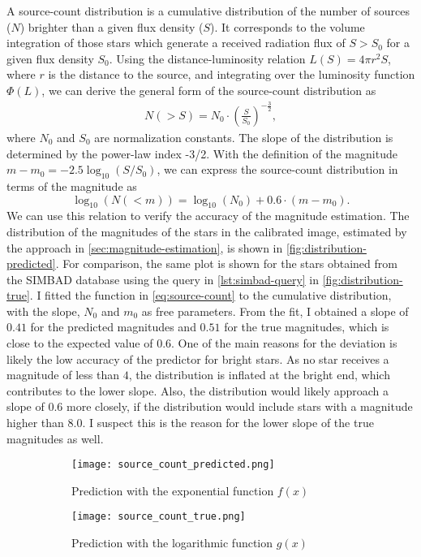 A source-count distribution is a cumulative distribution of the number of sources ($N$)
brighter than a given flux density ($S$). It corresponds to the volume integration of
those stars which generate a received radiation flux of $S > S_0$ for a given flux density
$S_0$. Using the distance-luminosity relation $L(S) = 4 \pi r^2 S$, where $r$ is the
distance to the source, and integrating over the luminosity function $\Phi(L)$, we can
derive the general form of the source-count distribution as
\begin{align*}
  N(> S) = N_0 \cdot \left(\frac{S}{S_0}\right)^{-\frac{3}{2}},
\end{align*}
where $N_0$ and $S_0$ are normalization constants. The slope of the distribution is
determined by the power-law index -3/2. With the definition of the magnitude $m - m_0 =
  -2.5 \log_{10}{(S/S_0)}$, we can express the source-count distribution in terms of the
magnitude as
\begin{equation}
  \log_{10}{(N(< m))} = \log_{10}{(N_0)} + 0.6 \cdot (m - m_0).
  \label{eq:source-count}
\end{equation}
We can use this relation to verify the accuracy of the magnitude estimation. The
distribution of the magnitudes of the stars in the calibrated image, estimated by the
approach in \autoref{sec:magnitude-estimation}, is shown in
\autoref{fig:distribution-predicted}. For comparison, the same plot is shown for the stars
obtained from the SIMBAD database using the query in \autoref{lst:simbad-query} in
\autoref{fig:distribution-true}. I fitted the function in \autoref{eq:source-count} to the
cumulative distribution, with the slope, $N_0$ and $m_0$ as free parameters. From the fit,
I obtained a slope of $0.41$ for the predicted magnitudes and $0.51$ for the true
magnitudes, which is close to the expected value of $0.6$. One of the main reasons for the
deviation is likely the low accuracy of the predictor for bright stars. As no star
receives a magnitude of less than $4$, the distribution is inflated at the bright end,
which contributes to the lower slope. Also, the distribution would likely approach a slope
of $0.6$ more closely, if the distribution would include stars with a magnitude higher
than 8.0. I suspect this is the reason for the lower slope of the true magnitudes as well.

\begin{figure}[tb]
  \centering
  \begin{subfigure}{.49\textwidth}
    \centering
    \texttt{[image: source\_count\_predicted.png]}
    \caption{Prediction with the exponential function $f(x)$}
    \label{fig:distribution-predicted}
  \end{subfigure}%
  \hfill
  \begin{subfigure}{.49\textwidth}
    \centering
    \texttt{[image: source\_count\_true.png]}
    \caption{Prediction with the logarithmic function $g(x)$}
    \label{fig:distribution-true}
  \end{subfigure}
  \caption{}
  \label{fig:source-count}
\end{figure}
